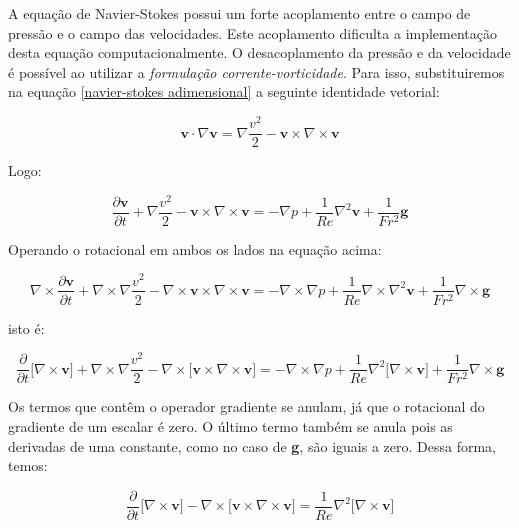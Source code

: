 A equação de Navier-Stokes possui um forte
acoplamento entre o campo de pressão e o 
campo das velocidades. Este acoplamento
dificulta a implementação desta equação computacionalmente.
O desacoplamento da pressão e 
da velocidade é possível ao utilizar a \textit{formulação corrente-vorticidade}.
Para isso, substituiremos na equação \ref{navier-stokes adimensional} a
seguinte identidade vetorial:

\begin{equation}
 \textbf{v} \cdot \nabla \textbf{v}
 = 
 \nabla \frac{v^{2}}{2}
 - 
 \textbf{v} \times \nabla \times \textbf{v}
\end{equation}

\medskip
\noindent
Logo:

\begin{equation}
 \frac{\partial \textbf{v}}{\partial t} 
 + 
 \nabla \frac{v^{2}}{2}
 - 
 \textbf{v} \times \nabla \times \textbf{v}
 =
 -
 \nabla p
 +
 \frac{1}{Re} \nabla^{2} \textbf{v}
 +
 \frac{1}{Fr^{2}} \textbf{g}
\end{equation}

\medskip
\noindent
Operando o rotacional em ambos os lados na equação acima:

\begin{equation}
 \nabla \times \frac{\partial \textbf{v}}{\partial t} 
 + 
 \nabla \times \nabla \frac{v^{2}}{2}
 - 
 \nabla \times \textbf{v} \times \nabla \times \textbf{v}
 =
 -
 \nabla \times \nabla p
 +
 \frac{1}{Re} \nabla \times \nabla^{2} \textbf{v}
 +
 \frac{1}{Fr^{2}} \nabla \times \textbf{g}
\end{equation}

\medskip
\noindent
isto é:

\begin{equation}
 \frac{\partial}{\partial t} \big[ \nabla \times \textbf{v} \big]
 + 
 \nabla \times \nabla \frac{v^{2}}{2}
 - 
 \nabla \times \big[ \textbf{v} \times \nabla \times \textbf{v} \big]
 =
 -
 \nabla \times \nabla p
 +
 \frac{1}{Re} \nabla^{2} \big[ \nabla \times \textbf{v} \big]
 +
 \frac{1}{Fr^{2}} \nabla \times \textbf{g}
\end{equation}

\medskip
Os termos que contêm o operador gradiente se anulam, 
já que o rotacional do gradiente de um escalar
é zero. O último termo também se anula pois as
derivadas de uma constante, como no caso de \textbf{g},
são iguais a zero. Dessa forma, temos:

\begin{equation}
 \frac{\partial}{\partial t} \big[ \nabla \times \textbf{v} \big]
 - 
 \nabla \times \big[ \textbf{v} \times \nabla \times \textbf{v} \big]
 =
 \frac{1}{Re} \nabla^{2} \big[ \nabla \times \textbf{v} \big]
\end{equation}

